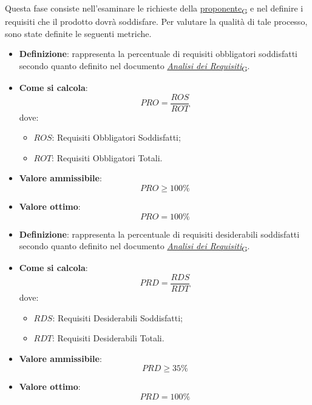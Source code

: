 Questa fase consiste nell'esaminare le richieste della \href{https://7last.github.io/docs/rtb/documentazione-interna/glossario\#proponente}{proponente\textsubscript{G}} e nel definire i requisiti che il prodotto dovrà soddisfare. Per valutare la qualità di tale processo, sono state definite le seguenti metriche.

\hypertarget{11M}{}
\begin{itemize}
	\item \textbf{Definizione}: rappresenta la percentuale di requisiti obbligatori soddisfatti secondo quanto definito nel documento \href{https://7last.github.io/docs/rtb/documentazione-interna/glossario\#analisi-dei-requisiti}{\textit{Analisi dei Requisiti}\textsubscript{G}}.
	\item \textbf{Come si calcola}: \begin{equation*}PRO = \frac{ROS}{ROT}\end{equation*} dove:
		\begin{itemize}
			\item $ROS$: Requisiti Obbligatori Soddisfatti;
			\item $ROT$: Requisiti Obbligatori Totali.
		\end{itemize}
	\item \textbf{Valore ammissibile}: \begin{equation*}PRO \geq 100\%\end{equation*}
	\item \textbf{Valore ottimo}: \begin{equation*}PRO = 100\%\end{equation*}
\end{itemize}

\hypertarget{12M}{}
\begin{itemize}
	\item \textbf{Definizione}: rappresenta la percentuale di requisiti desiderabili soddisfatti secondo quanto definito nel documento \href{https://7last.github.io/docs/rtb/documentazione-interna/glossario\#analisi-dei-requisiti}{\textit{Analisi dei Requisiti}\textsubscript{G}}.
	\item \textbf{Come si calcola}: \begin{equation*}PRD = \frac{RDS}{RDT}\end{equation*} dove:
		\begin{itemize}
			\item $RDS$: Requisiti Desiderabili Soddisfatti;
			\item $RDT$: Requisiti Desiderabili Totali.
		\end{itemize}
	\item \textbf{Valore ammissibile}: \begin{equation*}PRD \geq 35\%\end{equation*}
	\item \textbf{Valore ottimo}: \begin{equation*}PRD = 100\%\end{equation*}
\end{itemize}

